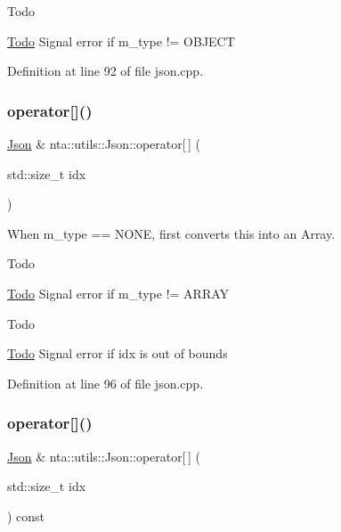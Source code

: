 \begin{DoxyRefDesc}{Todo}
\item[\hyperlink{todo__todo000018}{Todo}]Signal error if m\+\_\+type != O\+B\+J\+E\+CT \end{DoxyRefDesc}


Definition at line 92 of file json.\+cpp.

\mbox{\label{classnta_1_1utils_1_1Json_a236b5885612b74c21fbad169b21eaf55}} 
\subsubsection{\texorpdfstring{operator[]()}{operator[]()}\hspace{0.1cm}{\footnotesize\ttfamily [3/4]}}
{\footnotesize\ttfamily \hyperlink{classnta_1_1utils_1_1Json}{Json} \& nta\+::utils\+::\+Json\+::operator\mbox{[}$\,$\mbox{]} (\begin{DoxyParamCaption}\item[{std\+::size\+\_\+t}]{idx }\end{DoxyParamCaption})}



When m\+\_\+type == N\+O\+NE, first converts this into an Array. 

\begin{DoxyRefDesc}{Todo}
\item[\hyperlink{todo__todo000019}{Todo}]Signal error if m\+\_\+type != A\+R\+R\+AY \end{DoxyRefDesc}
\begin{DoxyRefDesc}{Todo}
\item[\hyperlink{todo__todo000020}{Todo}]Signal error if idx is out of bounds \end{DoxyRefDesc}


Definition at line 96 of file json.\+cpp.

\mbox{\label{classnta_1_1utils_1_1Json_a893f191111e604995488d147aaa711f8}} 
\subsubsection{\texorpdfstring{operator[]()}{operator[]()}\hspace{0.1cm}{\footnotesize\ttfamily [4/4]}}
{\footnotesize\ttfamily \hyperlink{classnta_1_1utils_1_1Json}{Json} \& nta\+::utils\+::\+Json\+::operator\mbox{[}$\,$\mbox{]} (\begin{DoxyParamCaption}\item[{std\+::size\+\_\+t}]{idx }\end{DoxyParamCaption}) const}


